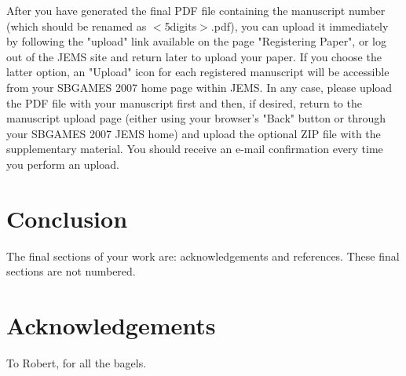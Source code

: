 \documentclass[a4paper]{sbgames}               %
\begin{document}
After you have generated the final PDF file containing the manuscript
number (which should be renamed as $<$5digits$>$.pdf), you can upload
it immediately by following the "upload" link available on the page
"Registering Paper", or log out of the JEMS site and return later to
upload your paper.  If you choose the latter option, an "Upload" icon
for each registered manuscript will be accessible from your SBGAMES
2007 home page within JEMS. In any case, please upload the PDF file
with your manuscript first and then, if desired, return to the
manuscript upload page (either using your browser's "Back" button or
through your SBGAMES 2007 JEMS home) and upload the optional ZIP file
with the supplementary material.  You should receive an e-mail
confirmation every time you perform an upload.

\section{Conclusion}
\label{sec:conclusion}

The final sections of your work are: acknowledgements and references.
These final sections are not numbered.

\section*{Acknowledgements}

To Robert, for all the bagels.



\end{document}
